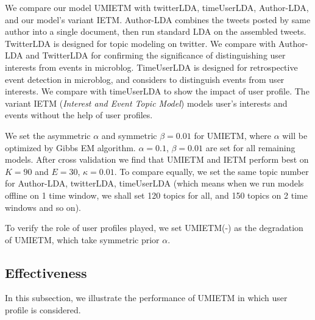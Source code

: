 \documentclass{llncs}
\begin{document}
We compare our model UMIETM with twitterLDA\cite{zhao2011twitterLDA}, timeUserLDA\cite{timeUserLDA2012finding}, Author-LDA, and our model's variant IETM.
Author-LDA combines the tweets posted by same author into a single document, then run standard LDA on the assembled tweets.
TwitterLDA is designed for topic modeling on twitter.
We compare with Author-LDA and TwitterLDA for confirming the significance of distinguishing user interests from events in microblog.
TimeUserLDA\cite{timeUserLDA2012finding} is designed for retrospective event detection in microblog, and considers to distinguish events from user interests.
We compare with timeUserLDA to show the impact of user profile.
The variant IETM (\textit{Interest and Event Topic Model}) models user's interests and events without the help of user profiles.


We set the asymmetric \(\alpha\) and symmetric \(\beta=0.01\) for UMIETM, where \(\alpha\) will be optimized by Gibbs EM algorithm\cite{wallach2008structured}.
\(\alpha=0.1\), \(\beta=0.01\) are set for all remaining models. 
After cross validation we find that UMIETM and IETM perform best on \(K=90\) and \(E=30\), \(\kappa=0.01\).
To compare equally, we set the same topic number for Author-LDA, twitterLDA, timeUserLDA (which means when we run models offline on 1 time window, we shall set 120 topics for all, and 150 topics on 2 time windows and so on).

To verify the role of user profiles played, we set UMIETM(-) as the degradation of UMIETM, which take symmetric prior \(\alpha\).

\subsection{Effectiveness}
In this subsection, we illustrate the performance of UMIETM in which user profile is considered.
\end{document}
